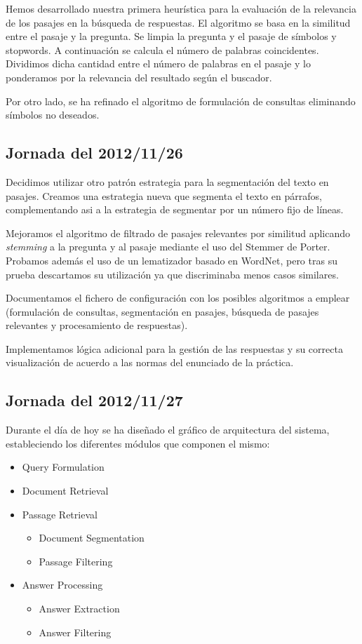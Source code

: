 \documentclass[12pt,a4paper,titlepage]{article}
\begin{document}
Hemos desarrollado nuestra primera heurística para la evaluación de la relevancia de los pasajes en la búsqueda de respuestas. El algoritmo se basa en la similitud entre el pasaje y la pregunta. Se limpia la pregunta y el pasaje de símbolos y stopwords. A continuación se calcula el número de palabras coincidentes. Dividimos dicha cantidad entre el número de palabras en el pasaje y lo ponderamos por la relevancia del resultado según el buscador.

Por otro lado, se ha refinado el algoritmo de formulación de consultas eliminando símbolos no deseados.

\subsection{Jornada del 2012/11/26}
Decidimos utilizar otro patrón estrategia para la segmentación del texto en pasajes. Creamos una estrategia nueva que segmenta el texto en párrafos, complementando asi a la estrategia de segmentar por un número fijo de líneas.

Mejoramos el algoritmo de filtrado de pasajes relevantes por similitud aplicando \emph{stemming} a la pregunta y al pasaje mediante el uso del Stemmer de Porter. Probamos además el uso de un lematizador basado en WordNet, pero tras su prueba descartamos su utilización ya que discriminaba menos casos similares.

Documentamos el fichero de configuración con los posibles algoritmos a emplear (formulación de consultas, segmentación en pasajes, búsqueda de pasajes relevantes y procesamiento de respuestas).

Implementamos lógica adicional para la gestión de las respuestas y su correcta visualización de acuerdo a las normas del enunciado de la práctica.

\subsection{Jornada del 2012/11/27}
Durante el día de hoy se ha diseñado el gráfico de arquitectura del sistema, estableciendo los diferentes módulos que componen el mismo:

\begin{itemize}
\item Query Formulation
\item Document Retrieval
\item Passage Retrieval
	\begin{itemize}
	\item Document Segmentation
	\item Passage Filtering
	\end{itemize}
\item Answer Processing
	\begin{itemize}
	\item Answer Extraction
	\item Answer Filtering
	\end{itemize}
\end{itemize}
\end{document}
